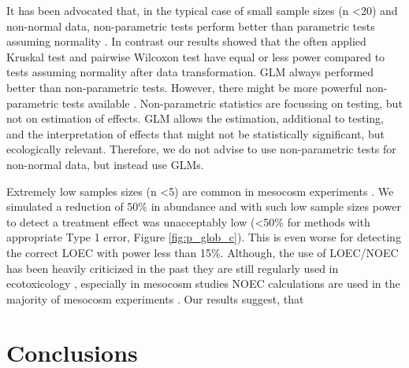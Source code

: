 \documentclass{scrartcl}
\begin{document}
It has been advocated that, in the typical case of small sample sizes (n \textless 20) and non-normal data, non-parametric tests perform better than parametric tests assuming normality \citep{wang_making_2011}.
In contrast our results showed that the often applied Kruskal test and pairwise Wilcoxon test have equal or less power compared to tests assuming normality after data transformation.
GLM always performed better than non-parametric tests. 
However, there might be more powerful non-parametric tests available \citep{konietschke_rank-based_2012}.
Non-parametric statistics are focussing on testing, but not on estimation of effects.
GLM allows the estimation, additional to testing, and the interpretation of effects that might not be statistically significant, but ecologically relevant.
Therefore, we do not advise to use non-parametric tests for non-normal data, but instead use GLMs.

Extremely low samples sizes (n \textless 5) are common in mesocosm experiments \citep{sanderson_pesticide_2002,szocs_analysing_2015}.
We simulated a reduction of 50\% in abundance and with such low sample sizes power to detect a treatment effect was unacceptably low (\textless 50\% for methods with appropriate Type 1 error, Figure \ref{fig:p_glob_c}).
This is even worse for detecting the correct LOEC with power less than 15\%.
Although, the use of LOEC/NOEC has been heavily criticized in the past \citep{landis_well_2011}  they are still regularly used in ecotoxicology \citep{jager_bad_2012}, especially in mesocosm studies NOEC calculations are used in the majority of mesocosm experiments \citep{brock_minimum_2014,efsa_ppr_guidance_2013}.
Our results suggest, that









\section{Conclusions}




\end{document}
